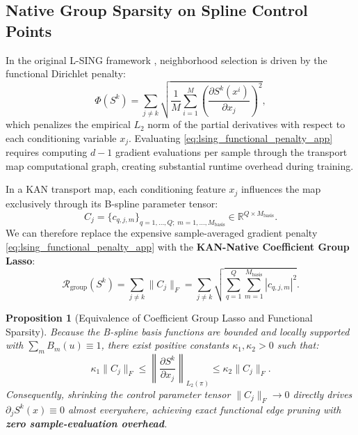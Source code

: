 \documentclass[11pt,a4paper]{article}
\theoremstyle{plain}
\newtheorem{proposition}[theorem]{Proposition}
\theoremstyle{definition}
\theoremstyle{remark}
\begin{document}
\subsection{Native Group Sparsity on Spline Control Points}

In the original L-SING framework \cite{liaw2025learning}, neighborhood selection is driven by the functional Dirichlet penalty:
\begin{equation}
    \Phi(S^k) = \sum_{j \neq k} \sqrt{\frac{1}{M} \sum_{i=1}^M \left( \frac{\partial S^k(x^i)}{\partial x_j} \right)^2},
    \label{eq:lsing_functional_penalty_app}
\end{equation}
which penalizes the empirical $L_2$ norm of the partial derivatives with respect to each conditioning variable $x_j$. Evaluating \eqref{eq:lsing_functional_penalty_app} requires computing $d-1$ gradient evaluations per sample through the transport map computational graph, creating substantial runtime overhead during training.

In a KAN transport map, each conditioning feature $x_j$ influences the map exclusively through its B-spline parameter tensor:
\begin{equation}
    C_j = \{ c_{q, j, m} \}_{q=1, \dots, Q; \; m=1, \dots, M_{\text{basis}}} \in \mathbb{R}^{Q \times M_{\text{basis}}}.
\end{equation}
We can therefore replace the expensive sample-averaged gradient penalty \eqref{eq:lsing_functional_penalty_app} with the \textbf{KAN-Native Coefficient Group Lasso}:
\begin{equation}
    \mathcal{R}_{\text{group}}(S^k) = \sum_{j \neq k} \|C_j\|_F = \sum_{j \neq k} \sqrt{\sum_{q=1}^Q \sum_{m=1}^{M_{\text{basis}}} |c_{q, j, m}|^2}.
    \label{eq:kan_group_lasso_app}
\end{equation}
\begin{proposition}[Equivalence of Coefficient Group Lasso and Functional Sparsity]
Because the B-spline basis functions are bounded and locally supported with $\sum_m B_m(u) \equiv 1$, there exist positive constants $\kappa_1, \kappa_2 > 0$ such that:
\begin{equation}
    \kappa_1 \|C_j\|_F \le \left\| \frac{\partial S^k}{\partial x_j} \right\|_{L_2(\pi)} \le \kappa_2 \|C_j\|_F.
\end{equation}
Consequently, shrinking the control parameter tensor $\|C_j\|_F \to 0$ directly drives $\partial_j S^k(x) \equiv 0$ almost everywhere, achieving exact functional edge pruning with \textbf{zero sample-evaluation overhead}.
\end{proposition}
\end{document}
